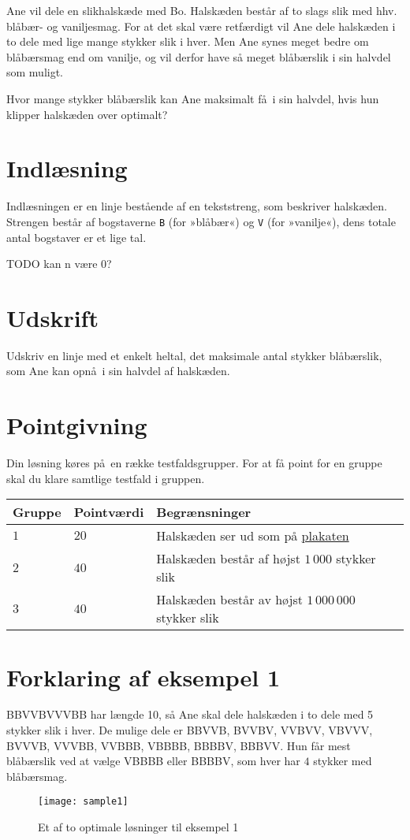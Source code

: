 Ane vil dele en slikhalskæde med Bo.
Halskæden består af to slags slik med hhv. blåbær- og vaniljesmag.
For at det skal være retfærdigt vil Ane dele halskæden i to dele med lige mange stykker slik i hver.
Men Ane synes meget bedre om blåbærsmag end om vanilje, og vil derfor have så meget blåbærslik i sin halvdel som muligt.

Hvor mange stykker blåbærslik kan Ane maksimalt få i sin halvdel, hvis hun klipper halskæden over optimalt?

\section*{Indlæsning}
Indlæsningen er en linje bestående af en tekststreng, som beskriver halskæden.
Strengen består af bogstaverne \texttt{B} (for »blåbær«) og \texttt{V} (for »vanilje«), dens totale antal bogstaver er et lige tal.

TODO kan n være 0?

\section*{Udskrift}
Udskriv en linje med et enkelt heltal, det maksimale antal stykker blåbærslik, som Ane kan opnå i sin halvdel af halskæden.

\section*{Pointgivning}

Din løsning køres på en række testfaldsgrupper.
For at få point for en gruppe skal du klare samtlige testfald i gruppen.

\noindent
\begin{tabular}{| l | l | l |}
\hline
Gruppe & Pointværdi & Begrænsninger \\ \hline
$1$   & $20$       & Halskæden ser ud som på \href{https://www.progolymp.se/2020/affisch.pdf}{plakaten} \\ \hline
$2$   & $40$       & Halskæden består af højst $1\,000$ stykker slik\\ \hline
$3$   & $40$       & Halskæden består av højst $1\,000\,000$ stykker slik \\ \hline
\end{tabular}

\section*{Forklaring af eksempel 1}
BBVVBVVVBB har længde 10, så Ane skal dele halskæden i to dele med 5 stykker slik i hver.
De mulige dele er BBVVB, BVVBV, VVBVV, VBVVV, BVVVB, VVVBB, VVBBB, VBBBB, BBBBV, BBBVV.
Hun får mest blåbærslik  ved at vælge VBBBB eller BBBBV, som hver har $4$ stykker med blåbærsmag.

\begin{figure}[h]
	\centering
\texttt{[image: sample1]}
\caption{Et af to optimale løsninger til eksempel 1}
\end{figure}
